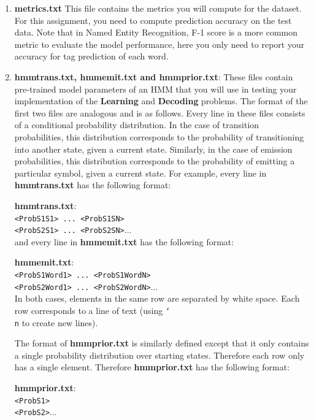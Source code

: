 \documentclass{article}
\begin{document}
\begin{enumerate}
\item \textbf{metrics.txt} This file contains the metrics you will compute for the dataset. For this assignment, you need to compute prediction accuracy on the test data. Note that in Named Entity Recognition, F-1 score is a more common metric to evaluate the model performance, here you only need to report your accuracy for tag prediction of each word.

\item \textbf{hmmtrans.txt, hmmemit.txt and hmmprior.txt}: These files contain pre-trained model parameters of an HMM that you will use in testing your implementation of the \textbf{Learning} and \textbf{Decoding} problems. The format of the first two files are analogous and is as follows. Every line in these files consists of a conditional probability distribution. In the case of transition probabilities, this distribution corresponds to the probability of transitioning into another state, given a current state. Similarly, in the case of emission probabilities, this distribution corresponds to the probability of emitting a particular symbol, given a current state. For example, every line in \textbf{hmmtrans.txt} has the following format:
    
    \textbf{hmmtrans.txt}:\\
    \texttt{<ProbS1S1> ... <ProbS1SN>}\\
     \texttt{<ProbS2S1> ... <ProbS2SN>}...\\   
    
and every line in \textbf{hmmemit.txt} has the following format:
    
    \textbf{hmmemit.txt}:\\
    \texttt{<ProbS1Word1> ... <ProbS1WordN>}\\
     \texttt{<ProbS2Word1> ... <ProbS2WordN>}...\\
    
In both cases, elements in the same row are separated by white space. Each row corresponds to a line of text (using \texttt{\char`\\ n} to create new lines).
    
    
The format of \textbf{hmmprior.txt} is similarly defined except that it only contains a single probability distribution over starting states. Therefore each row only has a single element. Therefore \textbf{hmmprior.txt} has the following format:
    
    \textbf{hmmprior.txt}:\\
    \texttt{<ProbS1>}\\
     \texttt{<ProbS2>}...\\


\end{enumerate}
\end{document}
